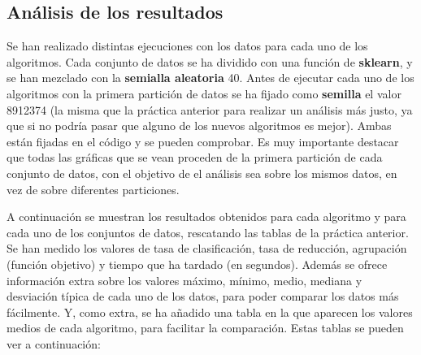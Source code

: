 \documentclass[11pt,a4paper]{article}
\begin{document}
\subsection{Análisis de los resultados}

Se han realizado distintas ejecuciones con los datos para cada uno de los algoritmos. Cada conjunto de datos se ha dividido
con una función de \textbf{sklearn}, y se han mezclado con la \textbf{semialla aleatoria} 40. Antes de ejecutar cada uno de los
algoritmos con la primera partición de datos se ha fijado como \textbf{semilla} el valor 8912374 (la misma que la práctica 
anterior para realizar un análisis más justo, ya que si no podría pasar que alguno de los nuevos algoritmos es mejor). Ambas 
están fijadas en el código y se pueden comprobar. Es muy importante destacar que todas las gráficas que se vean proceden de
la primera partición de cada conjunto de datos, con el objetivo de el análisis sea sobre los mismos datos, en vez de sobre
diferentes particiones.

A continuación se muestran los resultados obtenidos para cada algoritmo y para cada uno de los conjuntos de datos, rescatando
las tablas de la práctica anterior. Se han medido los valores de tasa de clasificación, tasa de reducción, agrupación (función
objetivo) y tiempo que ha tardado (en segundos). Además se ofrece información extra sobre los valores máximo, mínimo, medio,
mediana y desviación típica de cada uno de los datos, para poder comparar los datos más fácilmente. Y, como extra, se ha añadido
una tabla en la que aparecen los valores medios de cada algoritmo, para facilitar la comparación. Estas tablas se pueden ver
a continuación:
\end{document}
